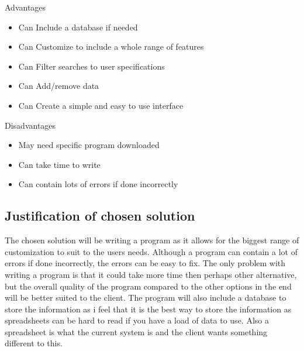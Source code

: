 {Advantages}
\begin{itemize}
	\item Can Include a database if needed
	\item Can Customize to include a whole range of features
	\item Can Filter searches to user specifications 
	\item Can Add/remove data
	\item Can Create a simple and easy to use interface
\end{itemize}
{Disadvantages}
\begin{itemize}
	\item May need specific program downloaded
	\item Can take time to write
	\item Can contain lots of errors if done incorrectly
\end{itemize}
\subsection{Justification of chosen solution}
The chosen solution will be writing a program as it allows for the biggest range of customization  to suit to the users needs. Although a program can contain a lot of errors if done incorrectly, the errors can be easy to fix. The only problem with writing a program is that it could take more time then perhaps other alternative, but the overall quality of the program compared to the other options in the end will be better suited to the client. The program will also include a database to store the information as i feel that it is the best way to store the information as spreadsheets  can be hard to read if you have a load of data to use. Also a spreadsheet is what the current system is and the client wants something different to this.